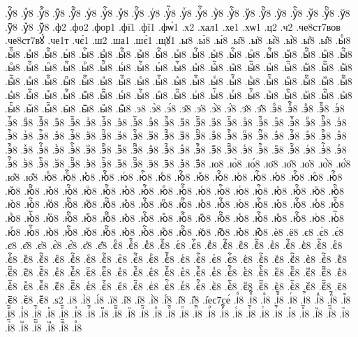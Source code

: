 {.уⷽ҇8
.уⷾ8
.уⷾ҇8
.уⷿ8
.уⷿ҇8
.уꙴ8
.уꙴ҇8
.уꙵ8
.уꙵ҇8
.уꙶ8
.уꙶ҇8
.уꙷ8
.уꙷ҇8
.уꙸ8
.уꙸ҇8
.уꙹ8
.уꙹ҇8
.уꙺ8
.уꙺ҇8
.уꙻ8
.уꙻ҇8
.у꙼8
.у꙼҇8
.у꙽8
.у꙽҇8
.ф2
.фо2
.фор1
.фї1
.фї1
.фѡ́1
.х2
.хал1
.хе1
.хѡ1
.ц2
.ч2
.че8ст7вов
.че8ст7вꙋ́
.че1т
.чє́1
.ш2
.ша1
.шє́1
.щꙋ1
.ы8
.ы̀8
.ы́8
.ы̑8
.ы҆8
.ы҆̀8
.ы҆́8
.ы҆̈8
.ы҆̑8
.ыⷠ8
.ыⷠ҇8
.ыⷡ8
.ыⷡ҇8
.ыⷢ8
.ыⷢ҇8
.ыⷣ8
.ыⷣ҇8
.ыⷤ8
.ыⷤ҇8
.ыⷥ8
.ыⷥ҇8
.ыⷦ8
.ыⷦ҇8
.ыⷧ8
.ыⷧ҇8
.ыⷨ8
.ыⷨ҇8
.ыⷩ8
.ыⷩ҇8
.ыⷪ8
.ыⷪ҇8
.ыⷫ8
.ыⷫ҇8
.ыⷬ8
.ыⷬ҇8
.ыⷭ8
.ыⷭ҇8
.ыⷮ8
.ыⷮ҇8
.ыⷯ8
.ыⷯ҇8
.ыⷰ8
.ыⷰ҇8
.ыⷱ8
.ыⷱ҇8
.ыⷲ8
.ыⷲ҇8
.ыⷳ8
.ыⷳ҇8
.ыⷴ8
.ыⷴ҇8
.ыⷵ8
.ыⷵ҇8
.ыⷶ8
.ыⷶ҇8
.ыⷷ8
.ыⷷ҇8
.ыⷸ8
.ыⷸ҇8
.ыⷹ8
.ыⷹ҇8
.ыⷺ8
.ыⷺ҇8
.ыⷻ8
.ыⷻ҇8
.ыⷼ8
.ыⷼ҇8
.ыⷽ8
.ыⷽ҇8
.ыⷾ8
.ыⷾ҇8
.ыⷿ8
.ыⷿ҇8
.ыꙴ8
.ыꙴ҇8
.ыꙵ8
.ыꙵ҇8
.ыꙶ8
.ыꙶ҇8
.ыꙷ8
.ыꙷ҇8
.ыꙸ8
.ыꙸ҇8
.ыꙹ8
.ыꙹ҇8
.ыꙺ8
.ыꙺ҇8
.ыꙻ8
.ыꙻ҇8
.ы꙼8
.ы꙼҇8
.ы꙽8
.ы꙽҇8
.э8
.э̀8
.э́8
.э̑8
.э҆8
.э҆̀8
.э҆́8
.э҆̈8
.э҆̑8
.эⷠ8
.эⷠ҇8
.эⷡ8
.эⷡ҇8
.эⷢ8
.эⷢ҇8
.эⷣ8
.эⷣ҇8
.эⷤ8
.эⷤ҇8
.эⷥ8
.эⷥ҇8
.эⷦ8
.эⷦ҇8
.эⷧ8
.эⷧ҇8
.эⷨ8
.эⷨ҇8
.эⷩ8
.эⷩ҇8
.эⷪ8
.эⷪ҇8
.эⷫ8
.эⷫ҇8
.эⷬ8
.эⷬ҇8
.эⷭ8
.эⷭ҇8
.эⷮ8
.эⷮ҇8
.эⷯ8
.эⷯ҇8
.эⷰ8
.эⷰ҇8
.эⷱ8
.эⷱ҇8
.эⷲ8
.эⷲ҇8
.эⷳ8
.эⷳ҇8
.эⷴ8
.эⷴ҇8
.эⷵ8
.эⷵ҇8
.эⷶ8
.эⷶ҇8
.эⷷ8
.эⷷ҇8
.эⷸ8
.эⷸ҇8
.эⷹ8
.эⷹ҇8
.эⷺ8
.эⷺ҇8
.эⷻ8
.эⷻ҇8
.эⷼ8
.эⷼ҇8
.эⷽ8
.эⷽ҇8
.эⷾ8
.эⷾ҇8
.эⷿ8
.эⷿ҇8
.эꙴ8
.эꙴ҇8
.эꙵ8
.эꙵ҇8
.эꙶ8
.эꙶ҇8
.эꙷ8
.эꙷ҇8
.эꙸ8
.эꙸ҇8
.эꙹ8
.эꙹ҇8
.эꙺ8
.эꙺ҇8
.эꙻ8
.эꙻ҇8
.э꙼8
.э꙼҇8
.э꙽8
.э꙽҇8
.ю8
.ю̀8
.ю́8
.ю̈8
.ю̑8
.ю҆8
.ю҆̀8
.ю҆́8
.ю҆̈8
.ю҆̑8
.юⷠ8
.юⷠ҇8
.юⷡ8
.юⷡ҇8
.юⷢ8
.юⷢ҇8
.юⷣ8
.юⷣ҇8
.юⷤ8
.юⷤ҇8
.юⷥ8
.юⷥ҇8
.юⷦ8
.юⷦ҇8
.юⷧ8
.юⷧ҇8
.юⷨ8
.юⷨ҇8
.юⷩ8
.юⷩ҇8
.юⷪ8
.юⷪ҇8
.юⷫ8
.юⷫ҇8
.юⷬ8
.юⷬ҇8
.юⷭ8
.юⷭ҇8
.юⷮ8
.юⷮ҇8
.юⷯ8
.юⷯ҇8
.юⷰ8
.юⷰ҇8
.юⷱ8
.юⷱ҇8
.юⷲ8
.юⷲ҇8
.юⷳ8
.юⷳ҇8
.юⷴ8
.юⷴ҇8
.юⷵ8
.юⷵ҇8
.юⷶ8
.юⷶ҇8
.юⷷ8
.юⷷ҇8
.юⷸ8
.юⷸ҇8
.юⷹ8
.юⷹ҇8
.юⷺ8
.юⷺ҇8
.юⷻ8
.юⷻ҇8
.юⷼ8
.юⷼ҇8
.юⷽ8
.юⷽ҇8
.юⷾ8
.юⷾ҇8
.юⷿ8
.юⷿ҇8
.юꙴ8
.юꙴ҇8
.юꙵ8
.юꙵ҇8
.юꙶ8
.юꙶ҇8
.юꙷ8
.юꙷ҇8
.юꙸ8
.юꙸ҇8
.юꙹ8
.юꙹ҇8
.юꙺ8
.юꙺ҇8
.юꙻ8
.юꙻ҇8
.ю꙼8
.ю꙼҇8
.ю꙽8
.ю꙽҇8
.ѐ8
.ё8
.є8
.є̀8
.є́8
.є̈8
.є̑8
.є҆8
.є҆̀8
.є҆́8
.є҆̈8
.є҆̑8
.єⷠ8
.єⷠ҇8
.єⷡ8
.єⷡ҇8
.єⷢ8
.єⷢ҇8
.єⷣ8
.єⷣ҇8
.єⷤ8
.єⷤ҇8
.єⷥ8
.єⷥ҇8
.єⷦ8
.єⷦ҇8
.єⷧ8
.єⷧ҇8
.єⷨ8
.єⷨ҇8
.єⷩ8
.єⷩ҇8
.єⷪ8
.єⷪ҇8
.єⷫ8
.єⷫ҇8
.єⷬ8
.єⷬ҇8
.єⷭ8
.єⷭ҇8
.єⷮ8
.єⷮ҇8
.єⷯ8
.єⷯ҇8
.єⷰ8
.єⷰ҇8
.єⷱ8
.єⷱ҇8
.єⷲ8
.єⷲ҇8
.єⷳ8
.єⷳ҇8
.єⷴ8
.єⷴ҇8
.єⷵ8
.єⷵ҇8
.єⷶ8
.єⷶ҇8
.єⷷ8
.єⷷ҇8
.єⷸ8
.єⷸ҇8
.єⷹ8
.єⷹ҇8
.єⷺ8
.єⷺ҇8
.єⷻ8
.єⷻ҇8
.єⷼ8
.єⷼ҇8
.єⷽ8
.єⷽ҇8
.єⷾ8
.єⷾ҇8
.єⷿ8
.єⷿ҇8
.єꙴ8
.єꙴ҇8
.єꙵ8
.єꙵ҇8
.єꙶ8
.єꙶ҇8
.єꙷ8
.єꙷ҇8
.єꙸ8
.єꙸ҇8
.єꙹ8
.єꙹ҇8
.єꙺ8
.єꙺ҇8
.єꙻ8
.єꙻ҇8
.є꙼8
.є꙼҇8
.є꙽8
.є꙽҇8
.ѕ2
.і8
.і̀8
.і́8
.ї8
.і̑8
.і҆8
.і҆̀8
.і҆́8
.і҆̈8
.і҆̑8
.і҆ес7се́
.іⷠ8
.іⷠ҇8
.іⷡ8
.іⷡ҇8
.іⷢ8
.іⷢ҇8
.іⷣ8
.іⷣ҇8
.іⷤ8
.іⷤ҇8
.іⷥ8
.іⷥ҇8
.іⷦ8
.іⷦ҇8
.іⷧ8
.іⷧ҇8
.іⷨ8
.іⷨ҇8
.іⷩ8
.іⷩ҇8
.іⷪ8
.іⷪ҇8
.іⷫ8
.іⷫ҇8
.іⷬ8
.іⷬ҇8
.іⷭ8
.іⷭ҇8
.іⷮ8
.іⷮ҇8
.іⷯ8
.іⷯ҇8
.іⷰ8
.іⷰ҇8
.іⷱ8
.іⷱ҇8
.іⷲ8
.іⷲ҇8
.іⷳ8
.іⷳ҇8
.іⷴ8
}
